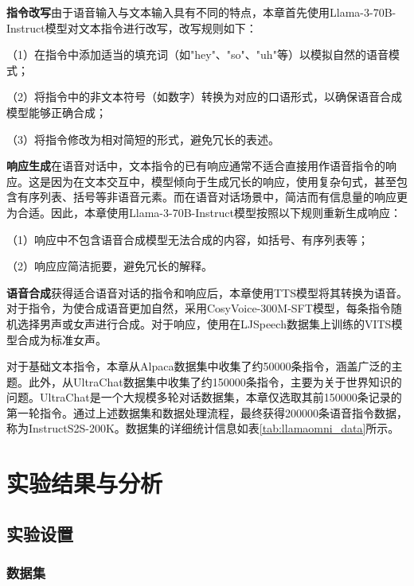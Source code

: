 \textbf{指令改写}\quad 由于语音输入与文本输入具有不同的特点，本章首先使用Llama-3-70B-Instruct模型对文本指令进行改写，改写规则如下：

（1）在指令中添加适当的填充词（如"hey"、"so"、"uh"等）以模拟自然的语音模式；

（2）将指令中的非文本符号（如数字）转换为对应的口语形式，以确保语音合成模型能够正确合成；

（3）将指令修改为相对简短的形式，避免冗长的表述。

\textbf{响应生成}\quad 在语音对话中，文本指令的已有响应通常不适合直接用作语音指令的响应。这是因为在文本交互中，模型倾向于生成冗长的响应，使用复杂句式，甚至包含有序列表、括号等非语音元素。而在语音对话场景中，简洁而有信息量的响应更为合适\citep{cho-etal-2024-speechworthy}。因此，本章使用Llama-3-70B-Instruct模型按照以下规则重新生成响应：

（1）响应中不包含语音合成模型无法合成的内容，如括号、有序列表等；

（2）响应应简洁扼要，避免冗长的解释。

\textbf{语音合成}\quad 获得适合语音对话的指令和响应后，本章使用TTS模型将其转换为语音。对于指令，为使合成语音更加自然，采用CosyVoice-300M-SFT\citep{du2024cosyvoice}模型，每条指令随机选择男声或女声进行合成。对于响应，使用在LJSpeech\citep{ljspeech17}数据集上训练的VITS\citep{kim2021conditional}模型合成为标准女声。



对于基础文本指令，本章从Alpaca\citep{alpaca}数据集中收集了约50000条指令，涵盖广泛的主题。此外，从UltraChat\citep{ultrachat}数据集中收集了约150000条指令，主要为关于世界知识的问题。UltraChat是一个大规模多轮对话数据集，本章仅选取其前150000条记录的第一轮指令。通过上述数据集和数据处理流程，最终获得200000条语音指令数据，称为InstructS2S-200K。数据集的详细统计信息如表\ref{tab:llamaomni_data}所示。


\section{实验结果与分析}

\subsection{实验设置}

\subsubsection{数据集}

